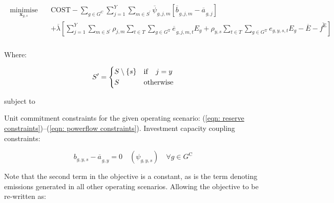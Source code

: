 \documentclass{article}
\newcommand{\sGeneratorsCandidate}{G^{\mathrm{C}}}
\newcommand{\sGeneratorsThermal}{G^{\mathrm{T}}}
\newcommand{\sYears}{Y}
\newcommand{\sScenarios}{S}
\newcommand{\sIntervals}{T}
\newcommand{\iGenerator}{g}
\newcommand{\iYear}{y}
\newcommand{\iYearAlias}{j}
\newcommand{\iScenario}{s}
\newcommand{\iScenarioAlias}{m}
\newcommand{\iInterval}{t}
\newcommand{\cScenarioDuration}[1][\iYear,\iScenario]{\rho_{#1}}
\newcommand{\cEmissionsIntensity}[1][\iGenerator]{E_{#1}}
\newcommand{\cEmmissionsCumulativeTarget}{\overline{E}}
\newcommand{\cObjectiveFunction}{\mathrm{COST}}
\newcommand{\vEnergy}[1][\iGenerator,\iYear,\iScenario,\iInterval]{e_{#1}}
\newcommand{\vEmissionsTargetViolation}{f^{\mathrm{E}}}
\newcommand{\vInstalledCapacityTotal}[1][\iGenerator,\iYear]{a_{#1}}
\newcommand{\vInstalledCapacityTotalScenario}[1][\iGenerator,\iYear,\iScenario]{b_{#1}}
\DeclareMathOperator*{\minimise}{minimise}
\begin{document}
\begin{align}
	\begin{split}
		\minimise\limits_{\bm{x}_{\iYear,\iScenario}} \quad &\cObjectiveFunction - \sum\limits_{\iGenerator \in \sGeneratorsCandidate}\sum\limits_{\iYearAlias=1}^{\sYears}\sum\limits_{\iScenarioAlias \in \sScenarios^{\prime}} \overline{\psi}_{\iGenerator,\iYearAlias,\iScenarioAlias}\left[\overline{\vInstalledCapacityTotalScenario[]}_{\iGenerator,\iYearAlias,\iScenarioAlias} - \overline{\vInstalledCapacityTotal[]}_{\iGenerator,\iYearAlias}\right]\\
		& + \overline{\lambda} \left[\sum\limits_{\iYearAlias=1}^{\sYears} \sum\limits_{\iScenarioAlias \in \sScenarios^{\prime}} \cScenarioDuration[\iYearAlias,\iScenarioAlias] \sum\limits_{\iInterval \in \sIntervals} \sum\limits_{\iGenerator \in \sGeneratorsThermal} \overline{\vEnergy[]}_{\iGenerator,\iYearAlias,\iScenarioAlias,\iInterval} \cEmissionsIntensity + \cScenarioDuration\sum\limits_{\iInterval \in \sIntervals}\sum\limits_{\iGenerator \in \sGeneratorsThermal} \vEnergy[\iGenerator,\iYear,\iScenario,\iInterval] \cEmissionsIntensity - \cEmmissionsCumulativeTarget - \overline{\vEmissionsTargetViolation}\right]\\
	\end{split}
\end{align}

Where:

\begin{equation}
	\sScenarios^{\prime} = 
	\begin{dcases}
	\sScenarios \setminus \{\iScenario\} & \mathrm{if} \quad \iYearAlias = \iYear\\
	\sScenarios & \mathrm{otherwise}\\
	\end{dcases}
\end{equation}

subject to

Unit commitment constraints for the given operating scenario: (\ref{eqn: reserve constraints})--(\ref{eqn: powerflow constraints}). Investment capacity coupling constraints:

\begin{equation}
\vInstalledCapacityTotalScenario - \overline{\vInstalledCapacityTotal[]}_{\iGenerator,\iYear} = 0 \quad (\psi_{\iGenerator,\iYear,\iScenario}) \quad \forall \iGenerator \in \sGeneratorsCandidate
\end{equation}

Note that the second term in the objective is a constant, as is the term denoting emissions generated in all other operating scenarios. Allowing the objective to be re-written as:
\end{document}
